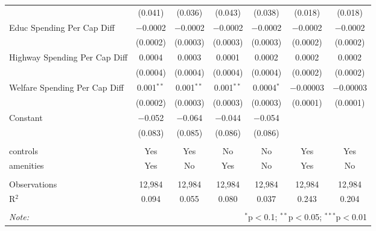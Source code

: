 \begin{table}[!htbp]
\begin{tabular}{@{\extracolsep{5pt}}lcccccc}
  & (0.041) & (0.036) & (0.043) & (0.038) & (0.018) & (0.018) \\ 
  Educ Spending Per Cap Diff & $-$0.0002 & $-$0.0002 & $-$0.0002 & $-$0.0002 & $-$0.0002 & $-$0.0002 \\ 
  & (0.0002) & (0.0003) & (0.0003) & (0.0003) & (0.0002) & (0.0002) \\ 
  Highway Spending Per Cap Diff & 0.0004 & 0.0003 & 0.0001 & 0.0002 & 0.0002 & 0.0002 \\ 
  & (0.0004) & (0.0004) & (0.0004) & (0.0004) & (0.0002) & (0.0002) \\ 
  Welfare Spending Per Cap Diff & 0.001$^{**}$ & 0.001$^{**}$ & 0.001$^{**}$ & 0.0004$^{*}$ & $-$0.00003 & $-$0.00003 \\ 
  & (0.0002) & (0.0003) & (0.0003) & (0.0003) & (0.0001) & (0.0001) \\ 
  Constant & $-$0.052 & $-$0.064 & $-$0.044 & $-$0.054 &  &  \\ 
  & (0.083) & (0.085) & (0.086) & (0.086) &  &  \\ 
 \hline \\[-1.8ex] 
controls & Yes & Yes & No & No & Yes & Yes \\ 
amenities & Yes & No & Yes & No & Yes & No \\ 
\hline \\[-1.8ex] 
Observations & 12,984 & 12,984 & 12,984 & 12,984 & 12,984 & 12,984 \\ 
R$^{2}$ & 0.094 & 0.055 & 0.080 & 0.037 & 0.243 & 0.204 \\ 
\hline 
\hline \\[-1.8ex] 
\textit{Note:}  & \multicolumn{6}{r}{$^{*}$p$<$0.1; $^{**}$p$<$0.05; $^{***}$p$<$0.01} \\ 
\end{tabular} 
\end{table} 
